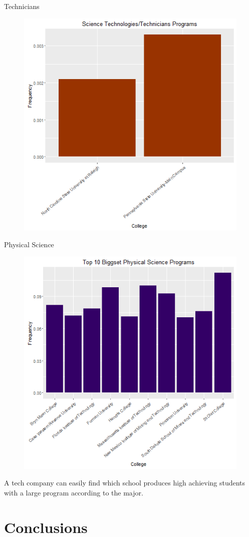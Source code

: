 \documentclass{article}
\begin{document}
Technicians
\begin{figure}[h!]
\includegraphics{../images/biggestTechnicians.png}
\end{figure}


Physical Science 
\begin{figure}[h!]
\includegraphics{../images/biggestPhysical.png}
\end{figure}


A tech company can easily find which school produces high achieving students with a large program according to the major. 

\section{Conclusions}
\end{document}
